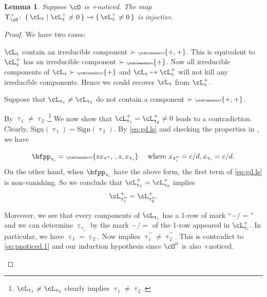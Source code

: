 \documentclass[12pt,a4paper]{amsart}
\numberwithin{equation}{section}
\newtheorem{lem}[thm]{Lemma}
\theoremstyle{remark}
\def\ssign{\mathrm{Sign}}
\let\ytb=\ytableaushort
\newcommand{\tytb}[1]{{\tiny\ytb{#1}}}
\def\cOpp{\cO^{\prime\prime}}
\def\pUpsilon{\Upsilon^+}
\def\pcL{\cL^+}
\def\uptaupp{\uptau^{\prime\prime}}
\begin{document}
\begin{lem}\label{c:gd.pnoticed}\label{c:gd.pnoticed.p}
    Suppose $\cO$ is +noticed.
    The map
    $\pUpsilon_{\cO} \colon \set{\cL_{\uptau}|\pcL_{\uptau}\neq 0}\rightarrow \set{\pcL_{\uptau}\neq 0}$
    is injective.
\end{lem}
\begin{proof}
    We have two cases:
    \begin{enumPF}
      \item $\cL_{\uptau}$ contain an irreducible component $\succ \tytb{+,+}$.
      This is equivalent to $\pcL_{\uptau}$ has an irreducible component
      $\succ\tytb{+}$. Now all irreducible components of
      $\cL_{\uptau} \succ \tytb{+}$ and $\cL_{\uptau}\mapsto \pcL_{\uptau}$ will
      not kill any irreducible components. Hence we could recover $\cL_{\uptau}$
      from $\pcL_{\uptau}$.%
      \item Suppose that $\cL_{\uptau_{1}}\neq \cL_{\uptau_{2}}$ do not contain
      a component $\succ \tytb{+,+}$.

      By 
      $\uptau_{1}\neq \uptau_{2}$.\footnote{$\cL_{\uptau_{1}}\neq \cL_{\uptau_{2}}$
        clearly implies $\uptau_{1}\neq \uptau_{2}$.} We now show that
      $\pcL_{\uptau_{1}}=\pcL_{\uptau_{2}}\neq 0$ leads to a contradiction.
      Clearly, $\ssign(\uptau_{1})=\ssign(\uptau_{2})$.
      By \eqref{eq:gd.ls} and checking the properties in , we have
      \[
        \bfpp_{\uptau_{i}} = \tytb{s{x_{\uptaupp}},\vdots,s,{x_{\uptau_{i}}}} \quad \text{
          where }x_{\uptaupp_{i}}=c/d, x_{\uptau_{i}}=c/d.
      \]
      On the other hand, when $\bfpp_{\uptau_{i}}$ have the above form, the
      first term of \eqref{eq:gd.ls} is non-vanishing. So we conclude that
      $\pcL_{\uptau_{1}}=\pcL_{\uptau_{2}}$ implies
      \begin{equation}\label{eq:pnoticed.1}
        \pcL_{\uptaupp_{1}}=\pcL_{\uptaupp_{2}}.
      \end{equation}

      Moreover, we see that every components of $\cL_{\uptau_{i}}$ has a 1-row
      of mark ``$-/=$'' and we can determine $\upepsilon_{\uptau_{i}}$ by the
      mark $-/=$ of the 1-row appeared in $\pcL_{\uptau_{i}}$. In particular, we
      have $\upepsilon_{1}=\upepsilon_{2}$. Now  implies
      $\uptaupp_{1}\neq \uptaupp_{2}$. This is contradict to
      \eqref{eq:pnoticed.1} and our induction hypothesis since $\cOpp$ is also
      +noticed.


\end{enumPF}
\end{proof}
\end{document}
